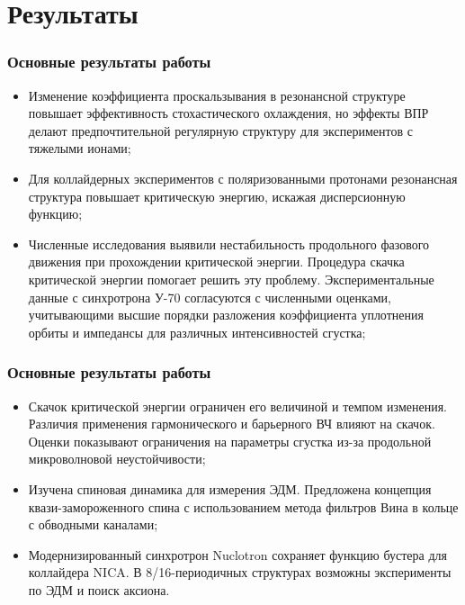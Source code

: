 \section{Результаты}
\begin{frame}
	\frametitle{Основные результаты работы}
	\begin{itemize}
		\item Изменение коэффициента проскальзывания в резонансной структуре повышает эффективность стохастического охлаждения, но эффекты ВПР делают предпочтительной регулярную структуру для экспериментов с тяжелыми ионами;
		\vspace{1em}
		\item Для коллайдерных экспериментов с поляризованными протонами резонансная структура повышает критическую энергию, искажая дисперсионную функцию;
		\vspace{1em}
		\item Численные исследования выявили нестабильность продольного фазового движения при прохождении критической энергии. Процедура скачка критической энергии помогает решить эту проблему. Экспериментальные данные с синхротрона У-70 согласуются с численными оценками, учитывающими высшие порядки разложения коэффициента уплотнения орбиты и импедансы для различных интенсивностей сгустка;
	\end{itemize}
\end{frame}
\begin{frame}
	\frametitle{Основные результаты работы}
	\begin{itemize}
		\item Скачок критической энергии ограничен его величиной и темпом изменения. Различия применения гармонического и барьерного ВЧ влияют на скачок. Оценки показывают ограничения на параметры сгустка из-за продольной микроволновой неустойчивости;
		\vspace{1em}
		\item Изучена спиновая динамика для измерения ЭДМ. Предложена концепция квази-замороженного спина с использованием метода фильтров Вина в кольце с обводными каналами;
		\vspace{1em}
		\item Модернизированный синхротрон Nuclotron сохраняет функцию бустера для коллайдера NICA. В 8/16-периодичных структурах возможны эксперименты по ЭДМ и поиск аксиона.
	\end{itemize}
\end{frame}
